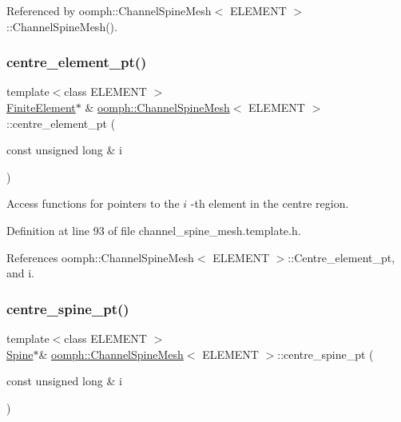 Referenced by oomph\+::\+Channel\+Spine\+Mesh$<$ E\+L\+E\+M\+E\+N\+T $>$\+::\+Channel\+Spine\+Mesh().

\mbox{\label{classoomph_1_1ChannelSpineMesh_a127dc05f48ad6af69f26dd1504eaeba5}} 
\subsubsection{\texorpdfstring{centre\+\_\+element\+\_\+pt()}{centre\_element\_pt()}}
{\footnotesize\ttfamily template$<$class E\+L\+E\+M\+E\+NT $>$ \\
\hyperlink{classoomph_1_1FiniteElement}{Finite\+Element}$\ast$ \& \hyperlink{classoomph_1_1ChannelSpineMesh}{oomph\+::\+Channel\+Spine\+Mesh}$<$ E\+L\+E\+M\+E\+NT $>$\+::centre\+\_\+element\+\_\+pt (\begin{DoxyParamCaption}\item[{const unsigned long \&}]{i }\end{DoxyParamCaption})\hspace{0.3cm}{\ttfamily [inline]}}



Access functions for pointers to the $ i $ -\/th element in the centre region. 



Definition at line 93 of file channel\+\_\+spine\+\_\+mesh.\+template.\+h.



References oomph\+::\+Channel\+Spine\+Mesh$<$ E\+L\+E\+M\+E\+N\+T $>$\+::\+Centre\+\_\+element\+\_\+pt, and i.

\mbox{\label{classoomph_1_1ChannelSpineMesh_a690cda061ec45945d981a24a2b206e69}} 
\subsubsection{\texorpdfstring{centre\+\_\+spine\+\_\+pt()}{centre\_spine\_pt()}}
{\footnotesize\ttfamily template$<$class E\+L\+E\+M\+E\+NT $>$ \\
\hyperlink{classoomph_1_1Spine}{Spine}$\ast$\& \hyperlink{classoomph_1_1ChannelSpineMesh}{oomph\+::\+Channel\+Spine\+Mesh}$<$ E\+L\+E\+M\+E\+NT $>$\+::centre\+\_\+spine\+\_\+pt (\begin{DoxyParamCaption}\item[{const unsigned long \&}]{i }\end{DoxyParamCaption})\hspace{0.3cm}{\ttfamily [inline]}}



